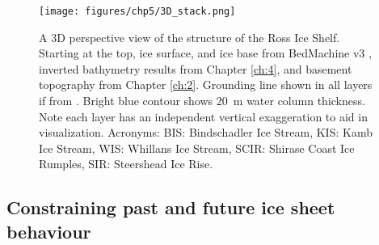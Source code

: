 \begin{figure}[!ht]
    \centering
    \texttt{[image: figures/chp5/3D\_stack.png]}
    \caption[3D perspective view of Ross Ice Shelf]{A 3D perspective view of the structure of the Ross Ice Shelf. Starting at the top, ice surface, and ice base from BedMachine v3 \citep{morlighemdeep2020, morlighemmeasures2022}, inverted bathymetry results from Chapter \ref{ch:4}, and basement topography from Chapter \ref{ch:2}. Grounding line shown in all layers if from \citet{morlighemmeasures2022}. Bright blue contour shows 20~m water column thickness. Note each layer has an independent vertical exaggeration to aid in visualization. Acronyms: BIS: Bindschadler Ice Stream, KIS: Kamb Ice Stream, WIS: Whillans Ice Stream, SCIR: Shirase Coast Ice Rumples, SIR: Steershead Ice Rise.}
    \label{fig:chp5_3D_stack}
\end{figure}


\subsection[Past and future implications]{Constraining past and future ice sheet behaviour}

